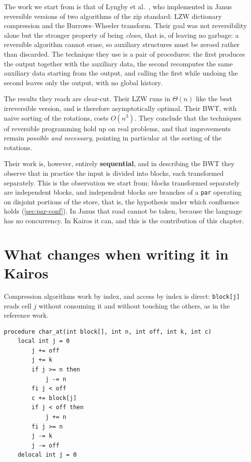 The work we start from is that of Lyngby et al.~\cite{LyngbyEtAl2024}, who
implemented in Janus reversible versions of two algorithms of the zip standard:
LZW dictionary compression and the Burrows--Wheeler transform. Their goal was
not reversibility alone but the stronger property of being
\emph{clean}, that is, of leaving no garbage: a reversible algorithm cannot
erase, so auxiliary structures must be zeroed rather than discarded. The
technique they use is a pair of procedures: the first produces the output
together with the auxiliary data, the second recomputes the same auxiliary data
starting from the output, and calling the first while undoing the second leaves
only the output, with no global history.

The results they reach are clear-cut. Their LZW runs in $\Theta(n)$ like the
best irreversible version, and is therefore asymptotically optimal. Their BWT,
with naive sorting of the rotations, costs $O(n^3)$. They conclude that the
techniques of reversible programming hold up on real problems, and that
improvements remain \emph{possible and necessary}, pointing in particular at
the sorting of the rotations.

Their work is, however, entirely \textbf{sequential}, and in describing the BWT
they observe that in practice the input is divided into blocks, each transformed
separately. This is the observation we start from: blocks transformed
separately are independent blocks, and independent blocks are branches of a
\texttt{par} operating on disjoint portions of the store, that is, the
hypothesis under which confluence holds (\cref{sec:par-conf}). In Janus that
road cannot be taken, because the language has no concurrency. In Kairos it
can, and this is the contribution of this chapter.

\section{What changes when writing it in Kairos}

Compression algorithms work by index, and access by index is direct:
\texttt{block[j]} reads cell $j$ without consuming it and without touching the
others, as in the reference work.

\begin{lstlisting}
procedure char_at(int block[], int n, int off, int k, int c)
    local int j = 0
        j += off
        j += k
        if j >= n then
            j -= n
        fi j < off
        c += block[j]
        if j < off then
            j += n
        fi j >= n
        j -= k
        j -= off
    delocal int j = 0
\end{lstlisting}

